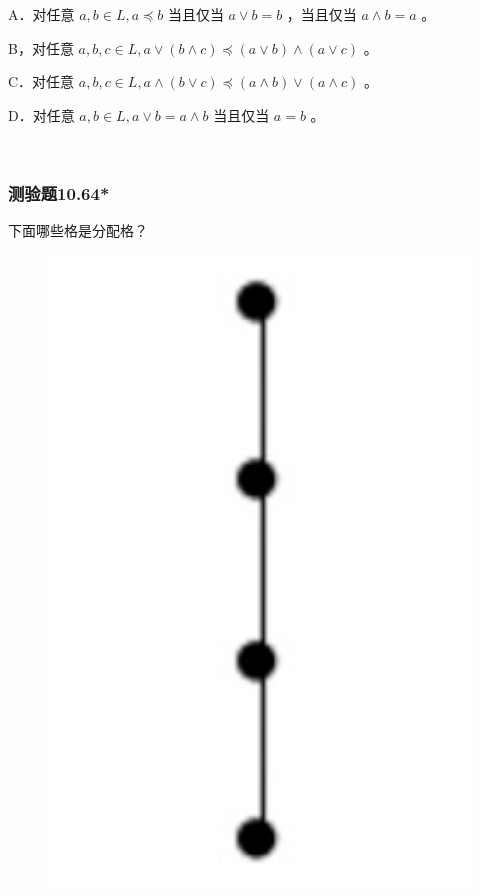 \documentclass[UTF8, heading=true]{ctexart}
\begin{document}
A．对任意 $a, b \in L, a \preceq b$ 当且仅当 $a \vee b=b$ ，当且仅当 $a \wedge b=a$ 。

B，对任意 $a, b, c \in L, a \vee(b \wedge c) \preceq(a \vee b) \wedge(a \vee c)$ 。

C．对任意 $a, b, c \in L, a \wedge(b \vee c) \preceq(a \wedge b) \vee(a \wedge c)$ 。

D．对任意 $a, b \in L, a \vee b=a \wedge b$ 当且仅当 $a=b$ 。

\textcolor{white}{答案：ABD}

\subsubsection{测验题10.64*}

下面哪些格是分配格？

\begin{figure}[H]
  \centering
  \begin{minipage}[t]{0.14\textwidth}
      \centering
      \includegraphics[width=1\textwidth]{10.64_1.jpg} %

\end{minipage}
\end{figure}
\end{document}
